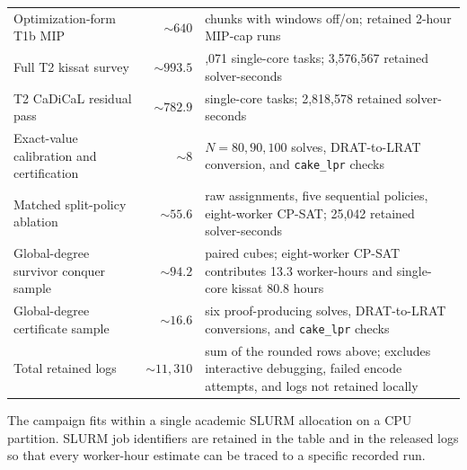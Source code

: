 {\begin{longtable}[]{@{}
  >{\raggedright\arraybackslash}p{}
  r
  >{\raggedright\arraybackslash}p{}@{}}
Optimization-form T1b MIP & $\sim640$ & 20 chunks with windows off/on; retained 2-hour MIP-cap runs \\
Full T2 kissat survey & $\sim993.5$ & 6,071 single-core tasks; 3,576,567 retained solver-seconds \\
T2 CaDiCaL residual pass & $\sim782.9$ & 112 single-core tasks; 2,818,578 retained solver-seconds \\
Exact-value calibration and certification & $\sim8$ & $N=80,90,100$ solves, DRAT-to-LRAT conversion, and \texttt{cake\_lpr} checks \\
Matched split-policy ablation & $\sim55.6$ & 500 raw assignments, five sequential policies, eight-worker CP-SAT; 25,042 retained solver-seconds \\
Global-degree survivor conquer sample & $\sim94.2$ & 100 paired cubes; eight-worker CP-SAT contributes 13.3 worker-hours and single-core kissat 80.8 hours \\
Global-degree certificate sample & $\sim16.6$ & six proof-producing solves, DRAT-to-LRAT conversions, and \texttt{cake\_lpr} checks \\
Total retained logs & $\sim11{,}310$ & sum of the rounded rows above; excludes interactive debugging, failed encode attempts, and logs not retained locally \\
\end{longtable}
}

The campaign fits within a single academic SLURM allocation on a
CPU partition. SLURM job identifiers are retained in the table and in the
released logs so that every worker-hour estimate can be traced to a
specific recorded run.
